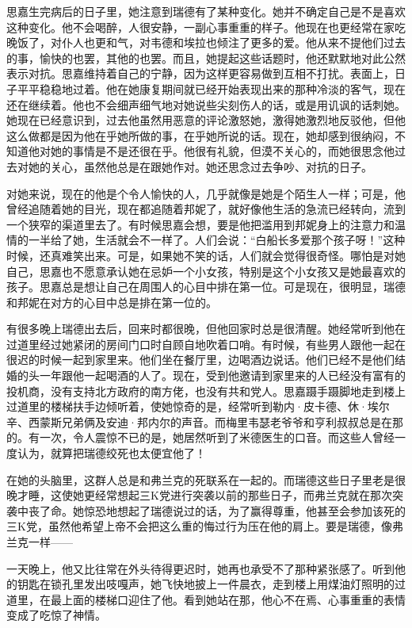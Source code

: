 \par 思嘉生完病后的日子里，她注意到瑞德有了某种变化。她并不确定自己是不是喜欢这种变化。他不会喝醉，人很安静，一副心事重重的样子。他现在也更经常在家吃晚饭了，对仆人也更和气，对韦德和埃拉也倾注了更多的爱。他从来不提他们过去的事，愉快的也罢，其他的也罢。而且，她提起这些话题时，他还默默地对此公然表示对抗。思嘉维持着自己的宁静，因为这样更容易做到互相不打扰。表面上，日子平平稳稳地过着。他在她康复期间就已经开始表现出来的那种冷淡的客气，现在还在继续着。他也不会细声细气地对她说些尖刻伤人的话，或是用讥讽的话刺她。她现在已经意识到，过去他虽然用恶意的评论激怒她，激得她激烈地反驳他，但他这么做都是因为他在乎她所做的事，在乎她所说的话。现在，她却感到很纳闷，不知道他对她的事情是不是还很在乎。他很有礼貌，但漠不关心的，而她很思念他过去对她的关心，虽然他总是在跟她作对。她还思念过去争吵、对抗的日子。
\par 对她来说，现在的他是个令人愉快的人，几乎就像是她是个陌生人一样；可是，他曾经追随着她的目光，现在都追随着邦妮了，就好像他生活的急流已经转向，流到一个狭窄的渠道里去了。有时候思嘉会想，要是他把滥用到邦妮身上的注意力和温情的一半给了她，生活就会不一样了。人们会说：“白船长多爱那个孩子呀！”这种时候，还真难笑出来。可是，如果她不笑的话，人们就会觉得很奇怪。哪怕是对她自己，思嘉也不愿意承认她在忌妒一个小女孩，特别是这个小女孩又是她最喜欢的孩子。思嘉总是想让自己在周围人的心目中排在第一位。可是现在，很明显，瑞德和邦妮在对方的心目中总是排在第一位的。
\par 有很多晚上瑞德出去后，回来时都很晚，但他回家时总是很清醒。她经常听到他在过道里经过她紧闭的房间门口时自顾自地吹着口哨。有时候，有些男人跟他一起在很迟的时候一起到家里来。他们坐在餐厅里，边喝酒边说话。他们已经不是他们结婚的头一年跟他一起喝酒的人了。现在，受到他邀请到家里来的人已经没有富有的投机商，没有支持北方政府的南方佬，也没有共和党人。思嘉蹑手蹑脚地走到楼上过道里的楼梯扶手边倾听着，使她惊奇的是，经常听到勒内·皮卡德、休·埃尔辛、西蒙斯兄弟俩及安迪·邦内尔的声音。而梅里韦瑟老爷爷和亨利叔叔总是在那的。有一次，令人震惊不已的是，她居然听到了米德医生的口音。而这些人曾经一度认为，就算把瑞德绞死也太便宜他了！
\par 在她的头脑里，这群人总是和弗兰克的死联系在一起的。而瑞德这些日子里老是很晚才睡，这使她更经常想起三K党进行突袭以前的那些日子，而弗兰克就在那次突袭中丧了命。她惊恐地想起了瑞德说过的话，为了赢得尊重，他甚至会参加该死的三K党，虽然他希望上帝不会把这么重的悔过行为压在他的肩上。要是瑞德，像弗兰克一样——
\par 一天晚上，他又比往常在外头待得更迟时，她再也承受不了那种紧张感了。听到他的钥匙在锁孔里发出吱嘎声，她飞快地披上一件晨衣，走到楼上用煤油灯照明的过道里，在最上面的楼梯口迎住了他。看到她站在那，他心不在焉、心事重重的表情变成了吃惊了神情。

